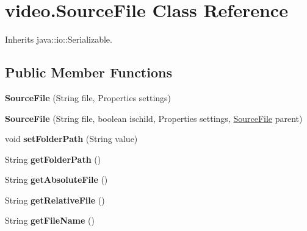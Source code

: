 \hypertarget{classvideo_1_1_source_file}{
\section{video.SourceFile Class Reference}
\label{classvideo_1_1_source_file}
}


Inherits java::io::Serializable.

\subsection*{Public Member Functions}
\begin{DoxyCompactItemize}
\item 
\hypertarget{classvideo_1_1_source_file_a8cfb97cc03313dd2ae0baa391dbeccd9}{
{\bfseries SourceFile} (String file, Properties settings)}
\label{classvideo_1_1_source_file_a8cfb97cc03313dd2ae0baa391dbeccd9}

\item 
\hypertarget{classvideo_1_1_source_file_accb055db7157f8b7d33c674d41333bf8}{
{\bfseries SourceFile} (String file, boolean ischild, Properties settings, \hyperlink{classvideo_1_1_source_file}{SourceFile} parent)}
\label{classvideo_1_1_source_file_accb055db7157f8b7d33c674d41333bf8}

\item 
\hypertarget{classvideo_1_1_source_file_aafe7b367acfe2aeec8ddc3b8822f400e}{
void {\bfseries setFolderPath} (String value)}
\label{classvideo_1_1_source_file_aafe7b367acfe2aeec8ddc3b8822f400e}

\item 
\hypertarget{classvideo_1_1_source_file_a7dcd9103fc4ebe6ad11421469f238806}{
String {\bfseries getFolderPath} ()}
\label{classvideo_1_1_source_file_a7dcd9103fc4ebe6ad11421469f238806}

\item 
\hypertarget{classvideo_1_1_source_file_a3d090d2ab6640f84bce756197f502b68}{
String {\bfseries getAbsoluteFile} ()}
\label{classvideo_1_1_source_file_a3d090d2ab6640f84bce756197f502b68}

\item 
\hypertarget{classvideo_1_1_source_file_a1a1343c7db81f7548f55203361a72af7}{
String {\bfseries getRelativeFile} ()}
\label{classvideo_1_1_source_file_a1a1343c7db81f7548f55203361a72af7}

\item 
\hypertarget{classvideo_1_1_source_file_a0b167a3dde8be6bbcc7909e0e094c86d}{
String {\bfseries getFileName} ()}
\label{classvideo_1_1_source_file_a0b167a3dde8be6bbcc7909e0e094c86d}


\end{DoxyCompactItemize}
